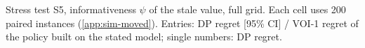 \begin{table}[!htbp]
\centering
\caption{Stress test S5, informativeness $\psi$ of the stale value, full grid. Each cell uses 200 paired instances (\cref{app:sim-moved}). Entries: DP regret [95\% CI] / VOI-1 regret of the policy built on the stated model; single numbers: DP regret.}
\label{tab:s5-full}
\scriptsize
\setlength{\tabcolsep}{3pt}
\resizebox{\linewidth}{!}{}
\end{table}
